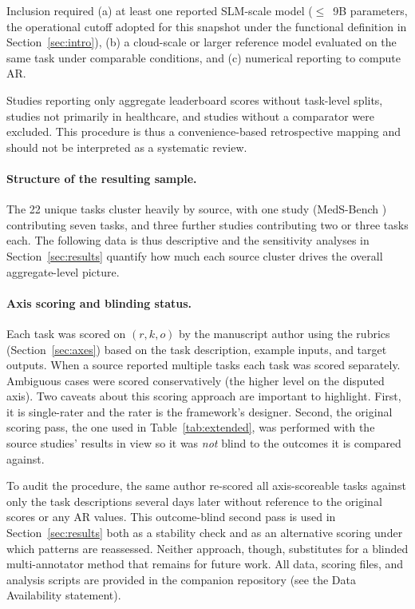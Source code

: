 \documentclass[11pt]{article}
\begin{document}
Inclusion required (a) at least one reported SLM-scale model ($\leq$~9B parameters, the operational cutoff adopted for this snapshot under the functional definition in Section~\ref{sec:intro}), (b) a cloud-scale or larger reference model evaluated on the same task under comparable conditions, and (c) numerical reporting to compute AR.

Studies reporting only aggregate leaderboard scores without task-level splits, studies not primarily in healthcare, and studies without a comparator were excluded. This procedure is thus a convenience-based retrospective mapping and should not be interpreted as a systematic review.

\paragraph{Structure of the resulting sample.}
The 22 unique tasks cluster heavily by source, with one study (MedS-Bench \cite{Wu2025MedS}) contributing seven tasks, and three further studies contributing two or three tasks each. The following data is thus descriptive and the sensitivity analyses in Section~\ref{sec:results} quantify how much each source cluster drives the overall aggregate-level picture.

\paragraph{Axis scoring and blinding status.}
Each task was scored on $(r, k, o)$ by the manuscript author using the rubrics (Section~\ref{sec:axes}) based on the task description, example inputs, and target outputs. When a source reported multiple tasks each task was scored separately. Ambiguous cases were scored conservatively (the higher level on the disputed axis). Two caveats about this scoring approach are important to highlight. First, it is single-rater and the rater is the framework's designer. Second, the original scoring pass, the one used in Table~\ref{tab:extended}, was performed with the source studies' results in view so it was \emph{not} blind to the outcomes it is compared against.

To audit the procedure, the same author re-scored all axis-scoreable tasks against only the task descriptions several days later without reference to the original scores or any AR values. This outcome-blind second pass is used in Section~\ref{sec:results} both as a stability check and as an alternative scoring under which patterns are reassessed. Neither approach, though, substitutes for a blinded multi-annotator method that remains for future work. All data, scoring files, and analysis scripts are provided in the companion repository (see the Data Availability statement).
\end{document}
